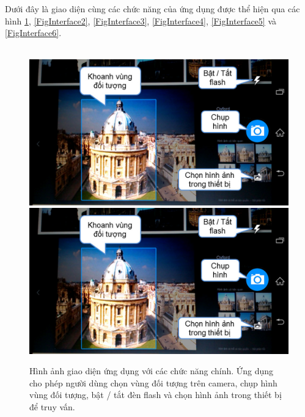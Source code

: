 Dưới đây là giao diện cùng các chức năng của ứng dụng được thể hiện qua các hình \ref{FigInterface1}, \ref{FigInterface2}, \ref{FigInterface3}, \ref{FigInterface4}, \ref{FigInterface5} và \ref{FigInterface6}.
\\
\\
\begin{figure}[!htbp]
  \begin{center}
    \leavevmode
    \ifpdf
      \includegraphics[scale=0.38]{interface_1}
    \else
      \includegraphics[scale=0.38]{interface_1}
    \fi
    \caption[Hình ảnh ứng dụng với các chức năng chính]{Hình ảnh giao diện ứng dụng với các chức năng chính. Ứng dụng cho phép người dùng chọn vùng đối tượng trên camera, chụp hình vùng đối tượng, bật / tắt đèn flash và chọn hình ảnh trong thiết bị để truy vấn.}
    \label{FigInterface1}
  \end{center}
\end{figure}
\\
\\
